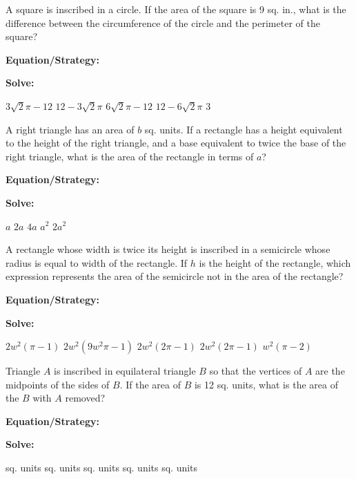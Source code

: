 \vfill
\newpage
\begin{multicols*}{2}
\begin{outline}[enumerate]
\medium

\1 A square is inscribed in a circle. If the area of the square is 9 sq. in., what is the difference between the circumference of the circle and the perimeter of the square?

\bigskip
\textbf{Equation/Strategy:} \hrulefill

\bigskip
\textbf{Solve:}

\vfill
\2 $3\sqrt{2}\pi-12$
\2 $12-3\sqrt{2}\pi$
\2 $6\sqrt{2}\pi-12$
\2 $12-6\sqrt{2}\pi$
\2 $3$

\midline

\1 A right triangle has an area of $b$ sq. units. If a rectangle has a height equivalent to the height of the right triangle, and a base equivalent to twice the base of the right triangle, what is the area of the rectangle in terms of $a$?

\bigskip
\textbf{Equation/Strategy:} \hrulefill

\bigskip
\textbf{Solve:}

\vfill
\2 $a$
\2 $2a$
\2 $4a$
\2 $a^2$
\2 $2a^2$

\columnbreak
\advanced

\1 A rectangle whose width is twice its height is inscribed in a semicircle whose radius is equal to width of the rectangle. If $h$ is the height of the rectangle, which expression represents the area of the semicircle not in the area of the rectangle?

\bigskip
\textbf{Equation/Strategy:} \hrulefill

\bigskip
\textbf{Solve:}

\vfill
\2 $2w^2(\pi-1)$
\2 $2w^2(9w^2\pi-1)$
\2 $2w^2(2\pi-1)$
\2 $2w^2(2\pi-1)$
\2 $w^2(\pi-2)$

\midline

\1 Triangle $A$ is inscribed in equilateral triangle $B$ so that the vertices of $A$ are the midpoints of the sides of $B$. If the area of $B$ is 12 sq. units, what is the area of the $B$ with $A$ removed?

\bigskip
\textbf{Equation/Strategy:}

\bigskip
\textbf{Solve:}

\vfill
{} sq. units
 sq. units
 sq. units
 sq. units
 sq. units
\end{outline}
\end{multicols*}